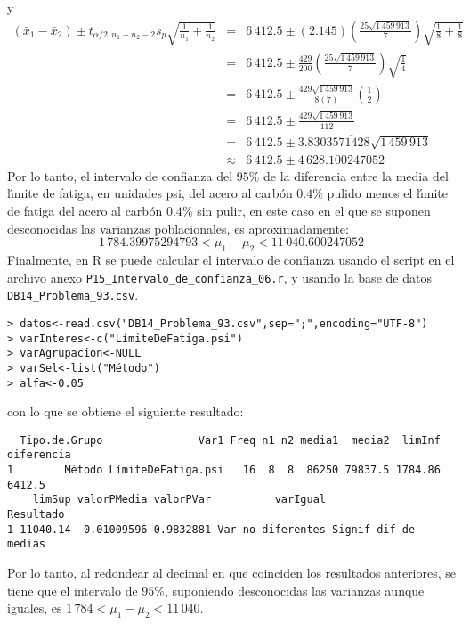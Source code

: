 \begin{solucion}
 y
 \begin{eqnarray*}
  \left( \bar{x}_1 - \bar{x}_2 \right) \pm t_{\alpha/2,n_1 +n_2 - 2} s_p \sqrt{\frac{1}{n_1} + \frac{1}{n_2}} & = & 6\,412.5 \pm (2.145)\left( \frac{25\sqrt{1\,459\,913}}{7} \right) \sqrt{\frac{1}{8} + \frac{1}{8}} \\
  & = & 6\,412.5 \pm \frac{429}{200}\left( \frac{25\sqrt{1\,459\,913}}{7} \right) \sqrt{\frac{1}{4}} \\
  & = & 6\,412.5 \pm \frac{429\sqrt{1\,459\,913}}{8(7)} \left( \frac{1}{2} \right) \\
  & = & 6\,412.5 \pm \frac{429\sqrt{1\,459\,913}}{112} \\
  & = & 6\,412.5 \pm 3.8303\overline{571428}\sqrt{1\,459\,913} \\
  & \approx & 6\,412.5 \pm 4\,628.100247052
 \end{eqnarray*}
 Por lo tanto, el intervalo de confianza del $95\%$ de la diferencia entre la media del l\'{\i}mite de fatiga, en unidades psi, del acero al carb\'on $0.4\%$ pulido menos el l\'{\i}mite de fatiga del acero al carb\'on $0.4\%$ sin pulir, en este caso en el que se suponen desconocidas las varianzas poblacionales, es aproximadamente:
 \begin{equation*}
  1\,784.39975294793 < \mu_1 - \mu_2 < 11\,040.600247052
 \end{equation*}
 Finalmente, en R se puede calcular el intervalo de confianza usando el script en el archivo anexo \texttt{P15\_Intervalo\_de\_confianza\_06.r}, y usando la base de datos \texttt{DB14\_Problema\_93.csv}.
 \begin{verbatim}
> datos<-read.csv("DB14_Problema_93.csv",sep=";",encoding="UTF-8")
> varInteres<-c("LímiteDeFatiga.psi")
> varAgrupacion<-NULL
> varSel<-list("Método")
> alfa<-0.05
 \end{verbatim}
 \vspace{-0.5cm}
 con lo que se obtiene el siguiente resultado:
 \begin{verbatim}
  Tipo.de.Grupo               Var1 Freq n1 n2 media1  media2  limInf diferencia
1        Método LímiteDeFatiga.psi   16  8  8  86250 79837.5 1784.86     6412.5
    limSup valorPMedia valorPVar          varIgual            Resultado
1 11040.14  0.01009596 0.9832881 Var no diferentes Signif dif de medias
 \end{verbatim}
 \vspace{-0.5cm}
 Por lo tanto, al redondear al decimal en que coinciden los resultados anteriores, se tiene que el intervalo de $95\%$, suponiendo desconocidas las varianzas aunque iguales, es $1\,784 < \mu_1 - \mu_2 < 11\,040$.

\end{solucion}
